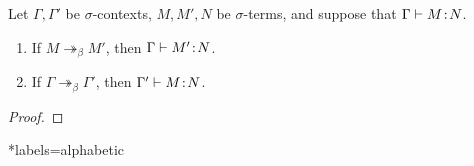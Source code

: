 \documentclass[reqno, twoside]{article}
\begin{document}
    \begin{theorem}
        Let $\Gamma,\Gamma'$ be $\sigma$-contexts, $M,M',N$ be $\sigma$-terms, and suppose that $\Gamma\vdash M\!:\!N$.
        \begin{enumerate}
            \item If $M\twoheadrightarrow_\beta M'$, then $\Gamma\vdash M'\!:\! N$.
                \vspace{-0.05in}
            \item If $\Gamma\twoheadrightarrow_\beta\Gamma'$, then $\Gamma'\vdash M\!:\! N$.
        \end{enumerate}
    \end{theorem}
    \begin{proof}
        \TODO
    \end{proof}

    \appendix

    \begin{bibdiv}
        \begin{biblist}*{labels={alphabetic}}
        \end{biblist}
    \end{bibdiv}
\end{document}
